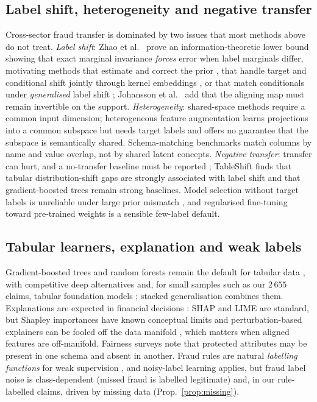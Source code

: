 \documentclass[journal]{IEEEtran}
\newcommand{\1}{\mathbf{1}}
\begin{document}
\subsection{Label shift, heterogeneity and negative transfer}
Cross-sector fraud transfer is dominated by two issues that most methods above do not treat. \emph{Label shift}: Zhao et al.\ \cite{zhao2019invariant} prove an information-theoretic lower bound showing that exact marginal invariance \emph{forces} error when label marginals differ, motivating methods that estimate and correct the prior \cite{saerens2002adjusting,lipton2018bbse}, that handle target and conditional shift jointly through kernel embeddings \cite{zhang2013target}, or that match conditionals under \emph{generalised} label shift \cite{tachet2020gls}; Johansson et al.\ \cite{johansson2019support} add that the aligning map must remain invertible on the support. \emph{Heterogeneity}: shared-space methods require a common input dimension; heterogeneous feature augmentation \cite{duan2012hfa} learns projections into a common subspace but needs target labels and offers no guarantee that the subspace is semantically shared. Schema-matching benchmarks \cite{koutras2020valentine} match columns by name and value overlap, not by shared latent concepts. \emph{Negative transfer}: transfer can hurt, and a no-transfer baseline must be reported \cite{wang2019negative}; TableShift \cite{gardner2023tableshift} finds that tabular distribution-shift gaps are strongly associated with label shift and that gradient-boosted trees remain strong baselines. Model selection without target labels is unreliable under large prior mismatch \cite{you2019dev}, and regularised fine-tuning toward pre-trained weights \cite{li2018l2sp} is a sensible few-label default.

\subsection{Tabular learners, explanation and weak labels}
Gradient-boosted trees \cite{chen2016xgboost} and random forests \cite{breiman2001rf} remain the default for tabular data \cite{grinsztajn2022trees,borisov2024deep}, with competitive deep alternatives \cite{gorishniy2021revisiting} and, for small samples such as our $2\,655$ claims, tabular foundation models \cite{hollmann2025tabpfn}; stacked generalisation \cite{wolpert1992stacked} combines them. Explanations are expected in financial decisions \cite{goodman2017gdpr}: SHAP \cite{lundberg2017shap,lundberg2020trees} and LIME \cite{ribeiro2016lime} are standard, but Shapley importances have known conceptual limits \cite{kumar2020shapley} and perturbation-based explainers can be fooled off the data manifold \cite{slack2020fooling}, which matters when aligned features are off-manifold. Fairness surveys \cite{mehrabi2021bias} note that protected attributes may be present in one schema and absent in another. Fraud rules are natural \emph{labelling functions} for weak supervision \cite{ratner2016dataprogramming,ratner2017snorkel}, and noisy-label learning \cite{song2022noisy} applies, but fraud label noise is class-dependent (missed fraud is labelled legitimate) and, in our rule-labelled claims, driven by missing data (Prop.~\ref{prop:missing}).
\end{document}
